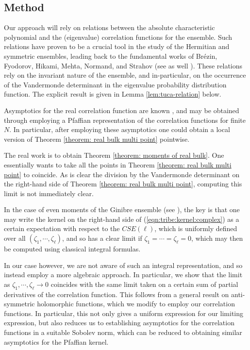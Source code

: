\documentclass[12pt]{article}
\numberwithin{info}{section}
\numberwithin{equation}{section}
\renewcommand{\[}{\begin{equation}}
\renewcommand{\]}{\end{equation}}
\newcommand{\<}{\langle}
\renewcommand{\>}{\rangle}
\begin{document}
	\subsection{Method}
	
	Our approach will rely on relations between the absolute characteristic polynomial and the (eigenvalue) correlation functions for the ensemble. Such relations have proven to be a crucial tool in the study of the Hermitian and symmetric ensembles, leading back to the fundamental works of Br\'{e}zin, Fyodorov, Hikami, Mehta, Normand, and Strahov \cite{BrezinBegin,KeyRelationPhys,FyoKeyRelation} (see as well \cite{holgersym,holgercom}). These relations rely on the invariant nature of the ensemble, and in-particular, on the occurrence of the Vandermonde determinant in the eigenvalue probability distribution function. The explicit result is given in Lemma \ref{lem:tuca-relation} below. 
	
	Asymptotics for the real correlation function are known \cite{forrester-elliptic,forrester-odd,sinclair}, and may be obtained through employing a Pfaffian representation of the correlation functions for finite $N$. In particular, after employing these asymptotics one could obtain a local version of Theorem \ref{theorem: real bulk multi point} pointwise.
	
	The real work is to obtain Theorem \ref{theorem: moments of real bulk}. One essentially wants to take all the points in Theorem \ref{theorem: real bulk multi point} to coincide. As is clear the division by the Vandermonde determinant on the right-hand side of Theorem \ref{theorem: real bulk multi point}, computing this limit is not immediately clear.
	
	In the case of even moments of the Ginibre ensemble (see \cite{nickrecent,tribe1,tribe3,afanasievreal}), the key is that one may write the kernel on the right-hand side of (\ref{eqn:tribe:kernel:complex}) as a certain expectation with respect to the $CSE(\ell)$, which is uniformly defined over all $(\zeta_1,\cdots,\zeta_\ell)$, and so has a clear limit if $\zeta_1=\cdots =\zeta_\ell=0$, which may then be computed using classical integral formulas.
	
	In our case however, we are not aware of such an integral representation, and so instead employ a more algebraic approach. In particular, we show that the limit as $\zeta_1,\cdots ,\zeta_\ell\to 0$ coincides with the same limit taken on a certain sum of partial derivatives of the correlation function. This follows from a general result on anti-symmetric holomorphic functions, which we modify to employ our  correlation functions. In particular, this not only gives a uniform expression for our limiting expression, but also reduces us to establishing asymptotics for the correlation functions in a suitable Sobolev norm, which can be reduced to obtaining similar asymptotics for the Pfaffian kernel.
	
\end{document}

